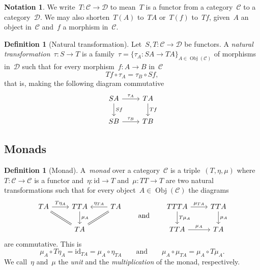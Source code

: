 \documentclass[a4paper]{article}
\theoremstyle{plain}
\theoremstyle{definition}
\newtheorem{definition}[theorem]{Definition}
\newtheorem{notation}[theorem]{Notation}
\DeclareMathOperator{\Obj}{Obj}
\newcommand{\id}{\mathrm{id}}
\newcommand{\cat}[1]{\mathcal{#1}}
\begin{document}
\begin{notation}
    We write~\(T:\cat{C}\longrightarrow\cat{D}\) to mean~\(T\) is a functor from
    a category~\(\cat{C}\) to a category~\(\cat{D}\).
    We may also shorten~\(T(A)\) to~\(TA\) or~\(T(f)\) to~\(Tf\), given~\(A\) an
    object in~\(\cat{C}\) and~\(f\) a morphism in~\(\cat{C}\).
\end{notation}

\begin{definition}[Natural transformation]
    \label{def:natural-transformation}
    Let~\(S,T:\cat{C}\longrightarrow\cat{D}\) be functors. A \emph{natural
    transformation}~\(\tau:S\longrightarrow T\) is a
    family~\(\tau=\{\tau_{A}:SA\longrightarrow TA\}_{A\in\Obj(\cat{C})}\) of
    morphisms in~\(\cat{D}\) such that for every
    morphism~\(f:A\longrightarrow B\) in~\(\cat{C}\)
    \[
        Tf \circ \tau_{A} = \tau_{B} \circ Sf,
    \]
    that is, making the following diagram commutative
    \[
        \begin{tikzcd}
            SA \arrow[r, "\tau_{A}"] \arrow[d, "Sf"] & TA \arrow[d, "Tf"] \\
            SB \arrow[r, "\tau_{B}"] & TB
        \end{tikzcd}
    \]
\end{definition}

\subsection{Monads}
\begin{definition}[Monad]
    \label{def:monad}
    A~\emph{monad} over a category~\(\cat{C}\) is a triple~\((T,\eta,\mu)\)
    where~\(T:\cat{C}\longrightarrow\cat{C}\) is a functor
    and~\(\eta:\id\longrightarrow T\) and~\(\mu:TT\longrightarrow T\) are two
    natural transformations such that for every object~\(A\in\Obj(\cat{C})\) the
    diagrams
    \[
        \begin{tikzcd}
            TA \arrow[r, "T\eta_{A}"] & TTA \arrow[d, "\mu_{A}"] & TA \arrow[l,
            swap, "\eta_{TA}"] \\
                                      & TA \arrow[ul, equal] \arrow[ur, equal] &
        \end{tikzcd}
        \qquad\text{and}\qquad
        \begin{tikzcd}
            TTTA \arrow[r, "\mu_{TA}"] \arrow[d, "T\mu_{A}"] & TTA \arrow[d,
            "\mu_{A}"] \\
            TTA \arrow[r, "\mu_{A}"] & TA
        \end{tikzcd}
    \]
    are commutative. This is
    \[
        \mu_{A}\circ T\eta_{A} = \id_{TA} = \mu_{A}\circ\eta_{TA}
        \qquad\text{and}\qquad
        \mu_{A}\circ \mu_{TA}
        = \mu_{A} \circ T\mu_{A}.
    \]
    We call~\(\eta\) and~\(\mu\) the \emph{unit} and the \emph{multiplication}
    of the monad, respectively.
\end{definition}
\end{document}
